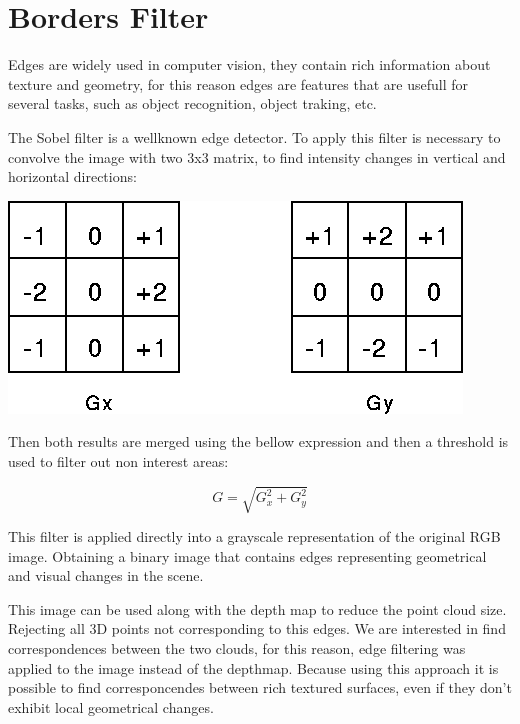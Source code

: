 \section{Borders Filter}

Edges are widely used in computer vision, they contain rich information about texture 
and geometry, for this reason edges are features that are usefull for several tasks, 
such as object recognition, object traking, etc.


The Sobel filter is a wellknown edge detector. To apply this filter is necessary to 
convolve the image with two 3x3 matrix, to find intensity changes in vertical and 
horizontal directions:

\begin{center}
\includegraphics[scale=0.35]{images/sobel}
\end{center}

Then both results are merged using the bellow expression and then a threshold is used to filter out non interest areas:

\begin{equation}
G = \sqrt{G_x^2+ G_y^2}
\label{eq:sobelGrad}
\end{equation}

This filter is applied directly into a grayscale representation of the original RGB image. Obtaining a binary image 
that contains edges representing geometrical and visual changes in the scene.


This image can be used along with the depth map to reduce the point cloud size. Rejecting all 3D points not corresponding
to this edges. We are interested in find correspondences between the two clouds, for this reason, edge filtering was applied
to the image instead of the depthmap. Because using this approach it is possible to find corresponcendes between rich textured 
surfaces, even if they don't exhibit local geometrical changes.

